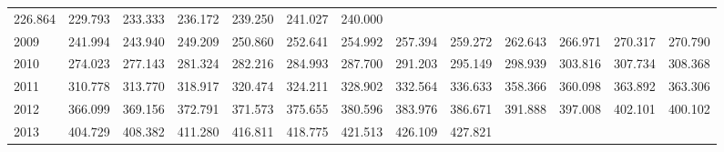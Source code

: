 \begin{tabular}{lllllllllllll}
  \multicolumn{1}{r}{226.864} &
  \multicolumn{1}{r}{229.793} &
  \multicolumn{1}{r}{233.333} &
  \multicolumn{1}{r}{236.172} &
  \multicolumn{1}{r}{239.250} &
  \multicolumn{1}{r}{241.027} &
  \multicolumn{1}{r}{240.000} \\
\multicolumn{1}{l}{\hspace{1em}2009} &
  \multicolumn{1}{|r}{241.994} &
  \multicolumn{1}{r}{243.940} &
  \multicolumn{1}{r}{249.209} &
  \multicolumn{1}{r}{250.860} &
  \multicolumn{1}{r}{252.641} &
  \multicolumn{1}{r}{254.992} &
  \multicolumn{1}{r}{257.394} &
  \multicolumn{1}{r}{259.272} &
  \multicolumn{1}{r}{262.643} &
  \multicolumn{1}{r}{266.971} &
  \multicolumn{1}{r}{270.317} &
  \multicolumn{1}{r}{270.790} \\
\multicolumn{1}{l}{\hspace{1em}2010} &
  \multicolumn{1}{|r}{274.023} &
  \multicolumn{1}{r}{277.143} &
  \multicolumn{1}{r}{281.324} &
  \multicolumn{1}{r}{282.216} &
  \multicolumn{1}{r}{284.993} &
  \multicolumn{1}{r}{287.700} &
  \multicolumn{1}{r}{291.203} &
  \multicolumn{1}{r}{295.149} &
  \multicolumn{1}{r}{298.939} &
  \multicolumn{1}{r}{303.816} &
  \multicolumn{1}{r}{307.734} &
  \multicolumn{1}{r}{308.368} \\
\multicolumn{1}{l}{\hspace{1em}2011} &
  \multicolumn{1}{|r}{310.778} &
  \multicolumn{1}{r}{313.770} &
  \multicolumn{1}{r}{318.917} &
  \multicolumn{1}{r}{320.474} &
  \multicolumn{1}{r}{324.211} &
  \multicolumn{1}{r}{328.902} &
  \multicolumn{1}{r}{332.564} &
  \multicolumn{1}{r}{336.633} &
  \multicolumn{1}{r}{358.366} &
  \multicolumn{1}{r}{360.098} &
  \multicolumn{1}{r}{363.892} &
  \multicolumn{1}{r}{363.306} \\
\multicolumn{1}{l}{\hspace{1em}2012} &
  \multicolumn{1}{|r}{366.099} &
  \multicolumn{1}{r}{369.156} &
  \multicolumn{1}{r}{372.791} &
  \multicolumn{1}{r}{371.573} &
  \multicolumn{1}{r}{375.655} &
  \multicolumn{1}{r}{380.596} &
  \multicolumn{1}{r}{383.976} &
  \multicolumn{1}{r}{386.671} &
  \multicolumn{1}{r}{391.888} &
  \multicolumn{1}{r}{397.008} &
  \multicolumn{1}{r}{402.101} &
  \multicolumn{1}{r}{400.102} \\
\multicolumn{1}{l}{\hspace{1em}2013} &
  \multicolumn{1}{|r}{404.729} &
  \multicolumn{1}{r}{408.382} &
  \multicolumn{1}{r}{411.280} &
  \multicolumn{1}{r}{416.811} &
  \multicolumn{1}{r}{418.775} &
  \multicolumn{1}{r}{421.513} &
  \multicolumn{1}{r}{426.109} &
  \multicolumn{1}{r}{427.821} &

\end{tabular}
